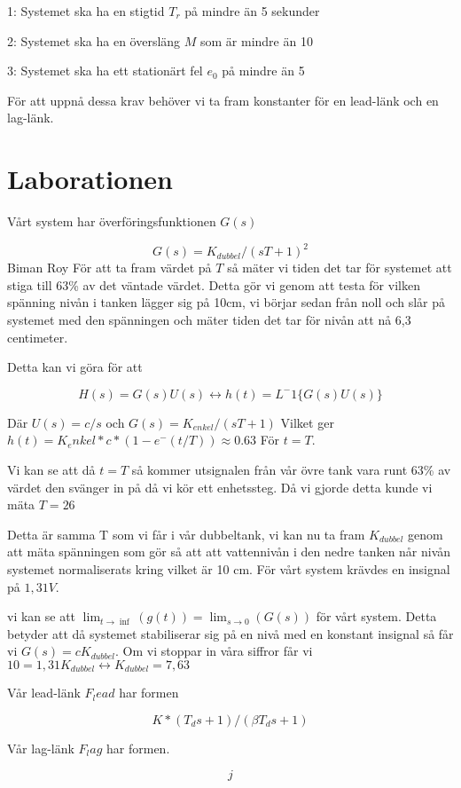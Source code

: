 \documentclass{acm_proc_article-sp}
\begin{document}
1: Systemet ska ha en stigtid $T_r$ på mindre än 5 sekunder

2: Systemet ska ha en översläng $M$ som är mindre än 10%

3: Systemet ska ha ett stationärt fel $e_0$ på mindre än 5%

För att uppnå dessa krav behöver vi ta fram konstanter för en lead-länk och en lag-länk.

\section{Laborationen}

Vårt system har överföringsfunktionen $G(s)$

\begin{equation}
G(s) = K_{dubbel}/(sT +1)^2
\end{equation}
Biman Roy
För att ta fram värdet på $T$ så mäter vi tiden det tar för systemet att stiga till 63\% av det väntade värdet. Detta gör vi genom att testa för vilken spänning nivån i tanken lägger sig på 10cm, vi börjar sedan från noll och slår på systemet med den spänningen och mäter tiden det tar för nivån att nå 6,3 centimeter.

Detta kan vi göra för att

\begin{equation}
H(s) = G(s)U(s) \leftrightarrow h(t) = L^-1\{G(s)U(s)\}
\end{equation}

Där $U(s) = c/s$ och $G(s) = K_{enkel}/(sT + 1)$ Vilket ger $h(t) = K_enkel * c * (1-e^-(t/T)) \approx 0.63$ För $t=T$.

Vi kan se att då $t = T$ så kommer utsignalen från vår övre tank vara runt 63\% av värdet den svänger in på då vi kör ett enhetssteg. Då vi gjorde detta kunde vi mäta $T = 26$

Detta är samma T som vi får i vår dubbeltank, vi kan nu ta fram $K_{dubbel}$ genom att mäta spänningen som gör så att att vattennivån i den nedre tanken når nivån systemet normaliserats kring vilket är 10 cm. För vårt system krävdes en insignal på $1,31V$.

vi kan se att $\lim_{t \rightarrow \inf}(g(t)) = \lim_{s \rightarrow 0}(G(s))$ för vårt system. Detta betyder att då systemet stabiliserar sig på en nivå med en konstant insignal så får vi $G(s) = c K_{dubbel}$. Om vi stoppar in våra siffror får vi $10 = 1,31 K_{dubbel} \leftrightarrow K_{dubbel} = 7,63$

Vår lead-länk $F_lead$ har formen

\begin{equation}
 K*(T_d s + 1)/(\beta T_d s +1)
\end{equation}

Vår lag-länk $F_lag$ har formen.

\begin{equation}
j
\end{equation}




\balancecolumns
\end{document}
